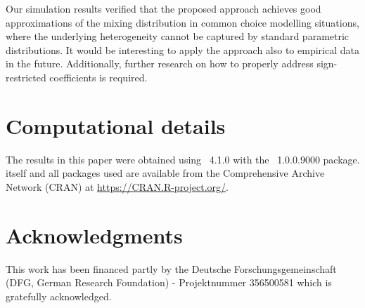 \documentclass[article]{jss}
\begin{document}
Our simulation results verified that the proposed approach achieves good approximations of the mixing distribution in common choice modelling situations, where the underlying heterogeneity cannot be captured by standard parametric distributions. It would be interesting to apply the approach also to empirical data in the future. Additionally,
further research on how to properly address sign-restricted coefficients is required.


\section*{Computational details}

The results in this paper were obtained using
~4.1.0 with the
~1.0.0.9000 package.  itself
and all packages used are available from the Comprehensive
 Archive Network (CRAN) at \url{https://CRAN.R-project.org/}.


\section*{Acknowledgments}

This work has been financed partly by the Deutsche Forschungsgemeinschaft (DFG, German Research Foundation) - Projektnummer 356500581 which is gratefully acknowledged.


\end{document}
